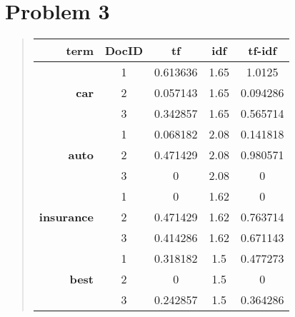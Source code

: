 \section{Problem 3}

\begin{quote}
    \begin{tabular}{|r|c|c|c|c|}
        \hline
        \textbf{term}&\textbf{DocID}&\textbf{tf}&\textbf{idf}&\textbf{tf-idf} \\
        \hline
        \multirow{3}{*}{\textbf{car}}
            &1&0.613636&1.65&1.0125 \\
            \cline{2-5}
            &2&0.057143&1.65&0.094286 \\
            \cline{2-5}
            &3&0.342857&1.65&0.565714 \\
        \hline
        \multirow{3}{*}{\textbf{auto}}
            &1&0.068182&2.08&0.141818 \\
            \cline{2-5}
            &2&0.471429&2.08&0.980571 \\
            \cline{2-5}
            &3&0&2.08&0 \\
        \hline
        \multirow{3}{*}{\textbf{insurance}}
            &1&0&1.62&0 \\
            \cline{2-5}
            &2&0.471429&1.62&0.763714 \\
            \cline{2-5}
            &3&0.414286&1.62&0.671143 \\
        \hline
        \multirow{3}{*}{\textbf{best}}
            &1&0.318182&1.5&0.477273 \\
            \cline{2-5}
            &2&0&1.5&0 \\
            \cline{2-5}
            &3&0.242857&1.5&0.364286 \\
        \hline
    \end{tabular}
\end{quote}